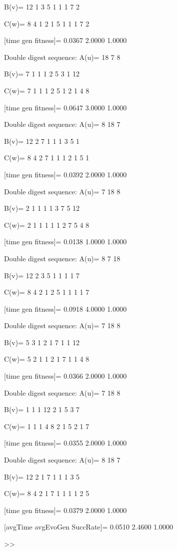 B(v)=
    12     1     3     5     1     1     1     7     2

C(w)=
     8     4     1     2     1     5     1     1     1     7     2

[time gen fitness]=
    0.0367    2.0000    1.0000

Double digest sequence:
A(u)=
    18     7     8

B(v)=
     7     1     1     1     2     5     3     1    12

C(w)=
     7     1     1     1     2     5     1     2     1     4     8

[time gen fitness]=
    0.0647    3.0000    1.0000

Double digest sequence:
A(u)=
     8    18     7

B(v)=
    12     2     7     1     1     1     3     5     1

C(w)=
     8     4     2     7     1     1     1     2     1     5     1

[time gen fitness]=
    0.0392    2.0000    1.0000

Double digest sequence:
A(u)=
     7    18     8

B(v)=
     2     1     1     1     1     3     7     5    12

C(w)=
     2     1     1     1     1     1     2     7     5     4     8

[time gen fitness]=
    0.0138    1.0000    1.0000

Double digest sequence:
A(u)=
     8     7    18

B(v)=
    12     2     3     5     1     1     1     1     7

C(w)=
     8     4     2     1     2     5     1     1     1     1     7

[time gen fitness]=
    0.0918    4.0000    1.0000

Double digest sequence:
A(u)=
     7    18     8

B(v)=
     5     3     1     2     1     7     1     1    12

C(w)=
     5     2     1     1     2     1     7     1     1     4     8

[time gen fitness]=
    0.0366    2.0000    1.0000

Double digest sequence:
A(u)=
     7    18     8

B(v)=
     1     1     1    12     2     1     5     3     7

C(w)=
     1     1     1     4     8     2     1     5     2     1     7

[time gen fitness]=
    0.0355    2.0000    1.0000

Double digest sequence:
A(u)=
     8    18     7

B(v)=
    12     2     1     7     1     1     1     3     5

C(w)=
     8     4     2     1     7     1     1     1     1     2     5

[time gen fitness]=
    0.0379    2.0000    1.0000

[avgTime  avgEvoGen  SuccRate]=
    0.0510    2.4600    1.0000

>> 